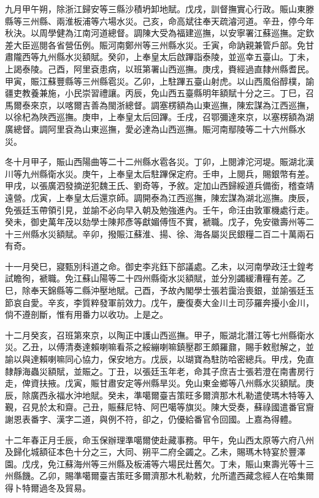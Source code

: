 \begin{pinyinscope}
九月甲午朔，除浙江歸安等三縣沙積坍卸地賦。戊戌，訓督撫實心行政。賑山東滕縣等三州縣、兩淮板浦等六場水災。己亥，命高斌往奉天疏濬河道。辛丑，停今年秋決。以周學健為江南河道總督。調陳大受為福建巡撫，以安寧署江蘇巡撫。定欽差大臣巡閱各省營伍例。賑河南鄭州等三州縣水災。壬寅，命訥親兼管戶部。免甘肅隴西等九州縣水災額賦。癸卯，上奉皇太后啟蹕詣泰陵，並巡幸五臺山。丁未，上謁泰陵。己酉，阿里袞患病，以班第署山西巡撫。庚戌，賚經過直隸州縣耆民。甲寅，賑江蘇豐縣等三州縣雹災。乙卯，上駐蹕五臺山射虎。以山西風俗醇樸，諭疆吏教養兼施，小民崇習禮讓。丙辰，免山西五臺縣明年額賦十分之三。丁巳，召馬爾泰來京，以喀爾吉善為閩浙總督。調塞楞額為山東巡撫，陳宏謀為江西巡撫，以徐杞為陜西巡撫。庚申，上奉皇太后回蹕。壬戌，召鄂彌達來京，以塞楞額為湖廣總督。調阿里袞為山東巡撫，愛必達為山西巡撫。賑河南鄢陵等二十六州縣水災。

冬十月甲子，賑山西陽曲等二十二州縣水雹各災。丁卯，上閱滹沱河堤。賑湖北漢川等九州縣衛水災。庚午，上奉皇太后駐蹕保定府。壬申，上閱兵，賜銀幣有差。甲戌，以張廣泗發摘逆犯魏王氏、劉奇等，予敘。定加山西歸綏道兵備銜，稽查靖遠營。戊寅，上奉皇太后還京師。調開泰為江西巡撫，陳宏謀為湖北巡撫。庚辰，免張廷玉帶領引見，並諭不必向早入朝及勉強進內。壬午，命汪由敦軍機處行走。癸未，御史萬年茂以劾學士陳邦彥等獻媚傅恆不實，褫職。戊子，免安徽壽州等二十三州縣水災額賦。辛卯，撥賑江蘇淮、揚、徐、海各屬災民銀糧二百二十萬兩石有奇。

十一月癸巳，寢甄別科道之命。御史李兆鈺下部議處。乙未，以河南學政汪士鍠考試瞻徇，褫職。免江蘇山陽等二十四州縣衛水災額賦，並分別蠲緩漕糧有差。乙巳，除奉天錦縣等二縣沖壓地賦。己酉，予故內閣學士張若靄治喪銀，並諭張廷玉節哀自愛。辛亥，李質粹發軍前效力。戊午，慶復奏大金川土司莎羅奔擾小金川，倘不遵剖斷，惟有用番力以收功。上是之。

十二月癸亥，召班第來京，以陶正中護山西巡撫。甲子，賑湖北潛江等七州縣衛水災。乙丑，以傅清奏達賴喇嘛看茶之綏繃喇嘛鎮壓郡王頗羅鼐，賜手敕慰解之，並諭以與達賴喇嘛同心協力，保安地方。戊辰，以瑚寶為駐防哈密總兵。甲戌，免直隸靜海蟲災額賦，並賑之。丁丑，以張廷玉年老，命其子庶吉士張若澄在南書房行走，俾資扶掖。戊寅，賑甘肅安定等州縣旱災。免山東金鄉等八州縣水災額賦。庚辰，除廣西永福水沖地賦。癸未，準噶爾臺吉策旺多爾濟那木札勒遣使瑪木特等入覲，召見於太和齋。己丑，賑蘇尼特、阿巴噶等旗災。陳大受奏，蘇祿國遣番官齎謝恩表番字、漢字二道，與例不符，卻之，仍優給番官令回國。上嘉為得體。

十二年春正月壬辰，命玉保辦理準噶爾使赴藏事務。甲午，免山西太原等六府八州及歸化城額征本色十分之三，大同、朔平二府全蠲之。乙未，賜瑪木特宴於豐澤園。戊戌，免江蘇海州等三州縣及板浦等六場民灶舊欠。丁未，賑山東壽光等十三州縣饑。乙卯，賜準噶爾臺吉策旺多爾濟那木札勒敕，允所遣西藏念經人在哈集爾得卜特爾過冬及貿易。


\end{pinyinscope}
